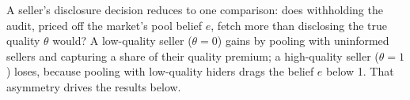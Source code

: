 A seller's disclosure decision reduces to one comparison: does withholding the audit, priced off the market's pool belief $e$, fetch more than disclosing the true quality $\theta$ would? A low-quality seller ($\theta=0$) gains by pooling with uninformed sellers and capturing a share of their quality premium; a high-quality seller ($\theta=1$) loses, because pooling with low-quality hiders drags the belief $e$ below 1. That asymmetry drives the results below.
